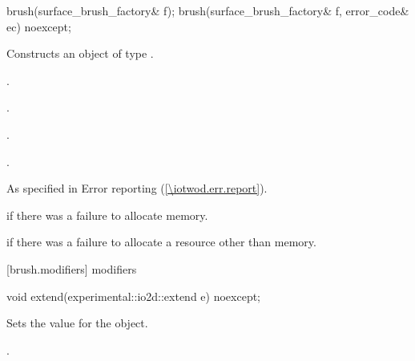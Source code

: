 %
%
%
%
%
%
%
%
\begin{itemdecl}
brush(surface_brush_factory& f);
brush(surface_brush_factory& f, error_code& ec) noexcept;
\end{itemdecl}
\begin{itemdescr}
\pnum
\effects
Constructs an object of type .

\pnum
\postconditions
{}.

.

.

.

\pnum
\throws
As specified in Error reporting (\ref{\iotwod.err.report}).

\pnum
\errors
{} if there was a failure to allocate memory.

 if there was a failure to allocate a resource other than memory.
\end{itemdescr}

 [brush.modifiers]{ modifiers}

\begin{itemdecl}
void extend(experimental::io2d::extend e) noexcept;
\end{itemdecl}
\begin{itemdescr}
\pnum
\effects
Sets the  value for the  object.

\pnum
\postconditions
{}.
\end{itemdescr}

